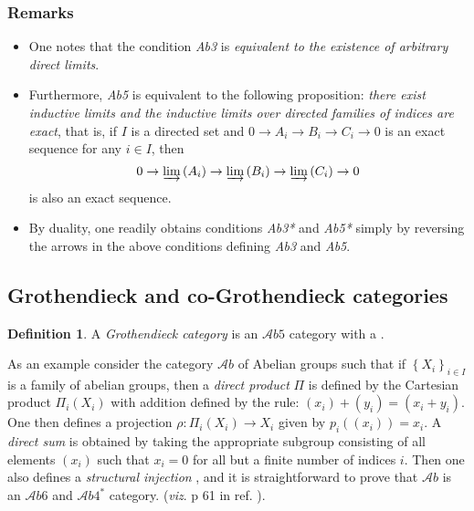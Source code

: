 \documentclass[12pt]{article}
\theoremstyle{plain}
\theoremstyle{definition}
\newtheorem{definition}{Definition}[section]
\numberwithin{equation}{section}
\newcommand{\A}{\mathcal A}
\DeclareMathOperator{\limdir}{\varinjlim}
\newcommand{\<}{{\langle}}
\begin{document}
\subsubsection{Remarks}

\begin{itemize}
 
\item One notes that the condition \emph{Ab3} is \emph{equivalent to the existence of arbitrary direct limits}. 

\item Furthermore, \emph{Ab5} is equivalent to the following proposition: 
\emph{there exist inductive limits and the inductive limits over directed families of indices are exact}, 
that is, if $I$ is a directed set and  $0 \to A_i \to B_i \to C_i \to 0$ is an exact 
sequence for any $i \in I$, then 
$$0 \to \limdir{(A_i)} \to \limdir{(B_i)} \to  \limdir{(C_i)} \to 0$$ 
is also an exact sequence.

\item By duality, one readily obtains conditions \emph{Ab3*} and \emph{Ab5*} simply 
by reversing the arrows in the above conditions defining \emph{Ab3} and \emph{Ab5}.
\end{itemize}

\subsection{Grothendieck and co-Grothendieck categories}

\begin{definition} A {\em Grothendieck category} is an $\mathcal{\A}b5$ category
with a . 
\end{definition}

As an example consider the category $\mathcal{\A}b$ of Abelian groups
such that if $\left\{X_i \right\}_{i \in I}$ is a family of abelian groups, then
a {\em direct product} $\Pi$ is defined by the Cartesian product $\Pi _i (X_i)$
with addition defined by the rule: $(x_i) + (y_i) = (x_i + y_i)$. 
One then defines a projection $\rho : \Pi _i (X_i) \rightarrow X_i$ given by 
$p_i ((x_i)) = x_i$. A {\em direct sum} is obtained by taking the appropriate subgroup
consisting of all elements $(x_i)$ such that $x_i = 0$ for all but a finite number of indices 
$i$. Then one also defines a {\em structural injection} , and it is straightforward
to prove that $\mathcal{\A}b$ is an $\mathcal{\A}b6$ and $\mathcal{\A}b4^*$
category. (\emph{viz}. p 61 in ref. \cite{NP65}). 
\end{document}
